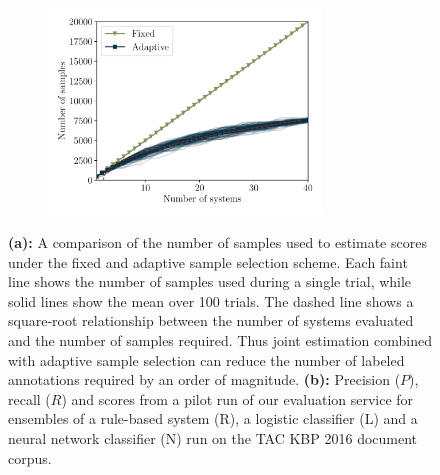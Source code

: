 \begin{figure}[!h]
  \centering
  \begin{subfigure}{\textwidth}
    \centering
    \includegraphics[width=0.8\textwidth]{figures/simulation/simulation-n}
    \caption{}
  \end{subfigure}

  \begin{subfigure}{0.49\textwidth}
    \centering
    
    \vfill
    \caption{\label{fig:kbpo:evaluation-results}}
  \end{subfigure}

  \caption[An evaluation of the importance-reweighted estimator]{\label{fig:kbpo:evaluation}
  \textbf{(a):} 
  A comparison of the number of samples used to estimate scores under the fixed and adaptive sample selection scheme.
  Each faint line shows the number of samples used during a single trial, while solid lines show the mean over 100 trials.
  The dashed line shows a square-root relationship between the number of systems evaluated and the number of samples required.
  Thus joint estimation combined with adaptive sample selection can reduce the number of labeled annotations required by an order of magnitude.
  \textbf{(b):} 
Precision ($P$), recall ($R$) and \fone{} scores from a pilot run of our evaluation service for ensembles of a rule-based system (R), a logistic classifier (L) and a neural network classifier (N) run on the TAC KBP 2016 document corpus. 
  }
\end{figure}

